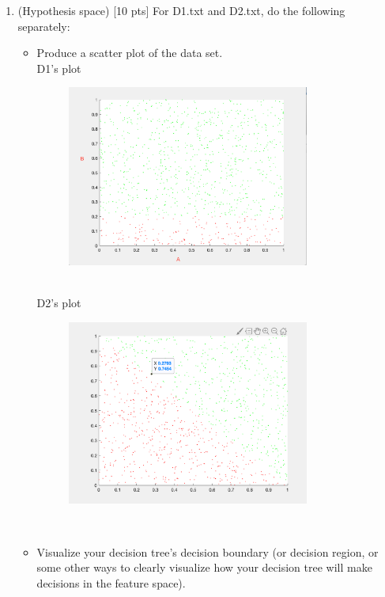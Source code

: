 \documentclass[a4paper]{article}
\theoremstyle{definition}
\begin{document}
\begin{enumerate}
  
\color{black}
\item (Hypothesis space)  [10 pts] For D1.txt and D2.txt, do the following separately:
  \begin{itemize}
  \item Produce a scatter plot of the data set.
  \\
  D1's plot
   \begin{figure}[H]
	       \centering
	        \includegraphics[width=0.8\textwidth]{6.png}
	       \captionsetup{labelformat=empty}
	     \caption{}
	       \label{fig:my_label}
	   \end{figure}
  \\
   D2's plot
   \begin{figure}[H]
	       \centering
	        \includegraphics[width=0.8\textwidth]{61.png}
	       \captionsetup{labelformat=empty}
	     \caption{}
	       \label{fig:my_label}
	   \end{figure}
  \\
  
  
  \item Visualize your decision tree's decision boundary (or decision region, or some other ways to clearly visualize how your decision tree will make decisions in the feature space).
  \end{itemize}
  

\end{enumerate}
\end{document}
